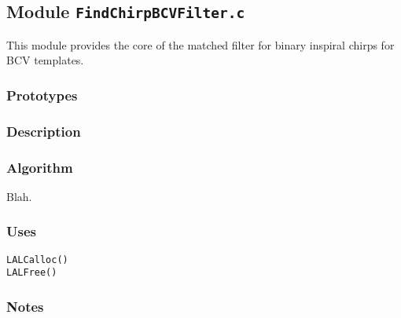 \subsection{Module \texttt{FindChirpBCVFilter.c}}
\label{ss:FindChirpBCVFilter.c}

This module provides the core of the matched filter for binary inspiral
chirps for BCV templates.

\subsubsection*{Prototypes}
\vspace{0.1in}


\subsubsection*{Description}

\subsubsection*{Algorithm}

Blah.

\subsubsection*{Uses}
\begin{verbatim}
LALCalloc()
LALFree()
\end{verbatim}

\subsubsection*{Notes}


